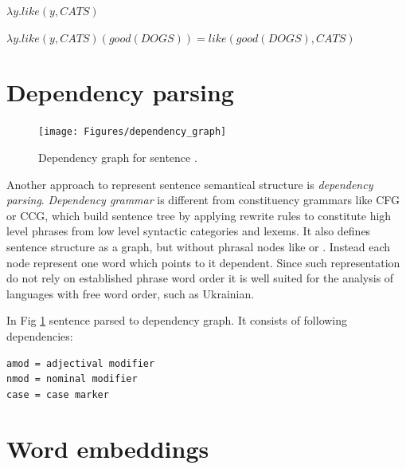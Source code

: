 $\lambda y.like(y, CATS)$

$\lambda y.like(y, CATS)(good(DOGS))=like(good(DOGS), CATS)$

\section{Dependency parsing}

\begin{figure}[h]
\centering
\texttt{[image: Figures/dependency\_graph]}
\decoRule
\caption[Syntax tree]{Dependency graph for sentence \protect\footnotemark.}
\label{fig:dependency_graph}
\end{figure}


Another approach to represent sentence semantical structure is \emph{dependency parsing}. \emph{Dependency grammar} is different from constituency grammars like CFG or CCG, which build sentence tree by applying rewrite rules to constitute high level phrases from low level syntactic categories and lexems. It also defines sentence structure as a graph, but without phrasal nodes like  or . Instead each node represent one word which points to it dependent. Since such representation do not rely on established phrase word order it is well suited for the analysis of languages with free word order, such as Ukrainian.



In Fig \ref{fig:dependency_graph} sentence  parsed to dependency graph. It consists of following dependencies: 

\begin{verbatim}
amod = adjectival modifier
nmod = nominal modifier
case = case marker
\end{verbatim}

\section{Word embeddings}

